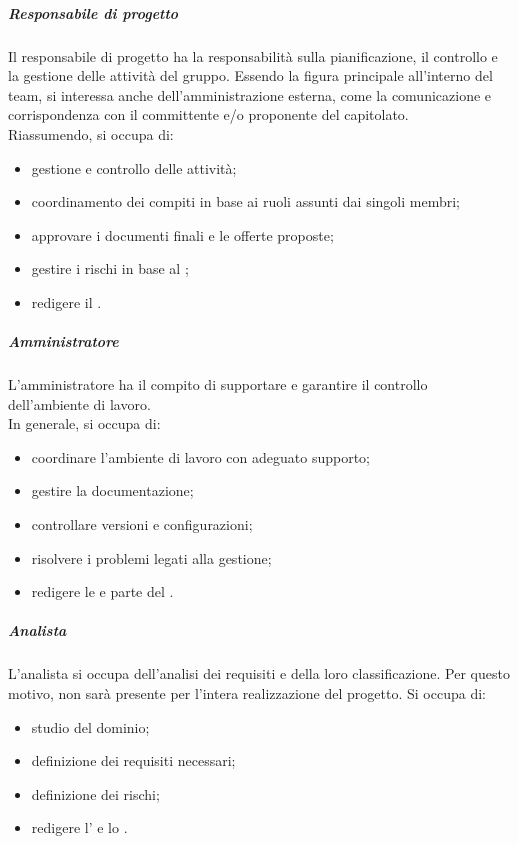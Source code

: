     		\subparagraph{Responsabile di progetto}
    		Il responsabile di progetto ha la responsabilità sulla pianificazione, il controllo e la gestione delle attività del gruppo. Essendo la figura principale all'interno del team, si interessa anche dell'amministrazione esterna, come la comunicazione e corrispondenza con il committente e/o proponente del capitolato.\\
    		Riassumendo, si occupa di:
    		\begin{itemize}
    			\item gestione e controllo delle attività;
    			\item coordinamento dei compiti in base ai ruoli assunti dai singoli membri;
    			\item approvare i documenti finali e le offerte proposte;
    			\item gestire i rischi in base al ;
    			\item redigere il .
    		\end{itemize}

    		\subparagraph{Amministratore}
    		L'amministratore ha il compito di supportare e garantire il controllo dell'ambiente di lavoro. \\
    		In generale, si occupa di:
    		\begin{itemize}
    			\item coordinare l'ambiente di lavoro con adeguato supporto;
    			\item gestire la documentazione;
    			\item controllare versioni e configurazioni;
    			\item risolvere i problemi legati alla gestione;
    			\item redigere le  e parte del .
    		\end{itemize}

    		\subparagraph{Analista}
    		L'analista si occupa dell'analisi dei requisiti e della loro classificazione. Per questo motivo, non sarà presente per l'intera realizzazione del progetto.
    		Si occupa di:
    		\begin{itemize}
    			\item studio del dominio;
    			\item definizione dei requisiti necessari;
    			\item definizione dei rischi;
    			\item redigere l' e lo .
    		\end{itemize}

